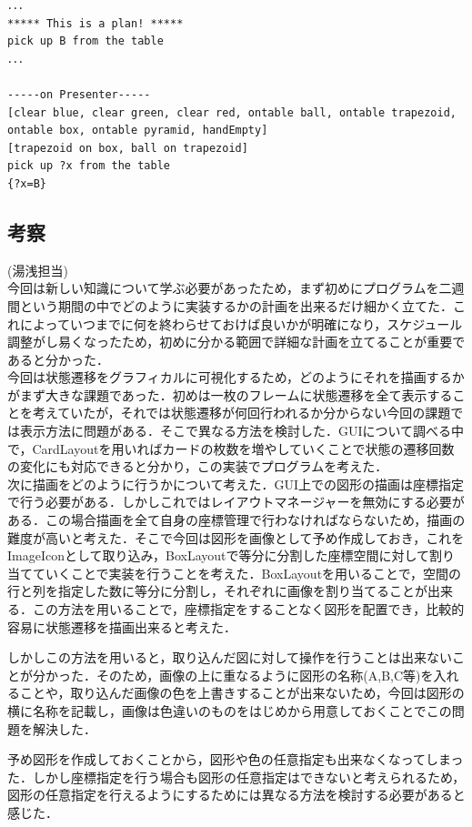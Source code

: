 \documentclass[uplatex,12pt]{jsarticle}
\begin{document}
\begin{lstlisting}[caption=Presenterの実行, label=pres]
．．．
***** This is a plan! *****
pick up B from the table
．．．

-----on Presenter-----
[clear blue, clear green, clear red, ontable ball, ontable trapezoid, ontable box, ontable pyramid, handEmpty]
[trapezoid on box, ball on trapezoid]
pick up ?x from the table
{?x=B}
\end{lstlisting}

\subsection{考察}
\noindent (湯浅担当) \\
今回は新しい知識について学ぶ必要があったため，まず初めにプログラムを二週間という期間の中でどのように実装するかの計画を出来るだけ細かく立てた．これによっていつまでに何を終わらせておけば良いかが明確になり，スケジュール調整がし易くなったため，初めに分かる範囲で詳細な計画を立てることが重要であると分かった．\\

今回は状態遷移をグラフィカルに可視化するため，どのようにそれを描画するかがまず大きな課題であった．初めは一枚のフレームに状態遷移を全て表示することを考えていたが，それでは状態遷移が何回行われるか分からない今回の課題では表示方法に問題がある．そこで異なる方法を検討した．GUIについて調べる中で，CardLayoutを用いればカードの枚数を増やしていくことで状態の遷移回数の変化にも対応できると分かり，この実装でプログラムを考えた．\\

次に描画をどのように行うかについて考えた．GUI上での図形の描画は座標指定で行う必要がある．しかしこれではレイアウトマネージャーを無効にする必要がある．この場合描画を全て自身の座標管理で行わなければならないため，描画の難度が高いと考えた．そこで今回は図形を画像として予め作成しておき，これをImageIconとして取り込み，BoxLayoutで等分に分割した座標空間に対して割り当てていくことで実装を行うことを考えた．BoxLayoutを用いることで，空間の行と列を指定した数に等分に分割し，それぞれに画像を割り当てることが出来る．この方法を用いることで，座標指定をすることなく図形を配置でき，比較的容易に状態遷移を描画出来ると考えた．\par
しかしこの方法を用いると，取り込んだ図に対して操作を行うことは出来ないことが分かった．そのため，画像の上に重なるように図形の名称(A,B,C等)を入れることや，取り込んだ画像の色を上書きすることが出来ないため，今回は図形の横に名称を記載し，画像は色違いのものをはじめから用意しておくことでこの問題を解決した．\par
予め図形を作成しておくことから，図形や色の任意指定も出来なくなってしまった．しかし座標指定を行う場合も図形の任意指定はできないと考えられるため，図形の任意指定を行えるようにするためには異なる方法を検討する必要があると感じた．\\
\end{document}
